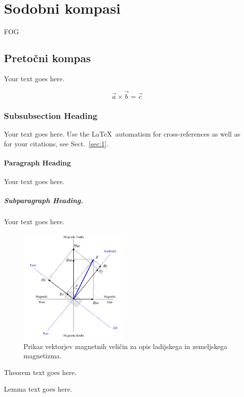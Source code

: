 \section{Sodobni kompasi}
\label{PogKompSod}
FOG

\subsection{Pretočni kompas}
\label{PopdpPretKomp}
Your text goes here.

\begin{equation}
	\vec{a}\times\vec{b}=\vec{c}
\end{equation}

\subsubsection{Subsubsection Heading}
Your text goes here. Use the \LaTeX\ automatism for cross-references as
well as for your citations, see Sect.~\ref{sec:1}.

\paragraph{Paragraph Heading} %
Your text goes here.

\subparagraph{Subparagraph Heading.} Your text goes here.%
%
%
%
%
%
\begin{figure}[!ht]%
	\vspace{0pt}
	\begin{center}
		\includegraphics[width=0.48\textwidth]{Predavanja/02_KompasnoDolocSmeri/figs/2016LadijskiMagnetniVektorji.png}
	\end{center}
	\vspace{0pt}
	\caption{Prikaz vektorjev magnetnih veličin za opis ladijskega in zemeljskega magnetizma. \cite{Basterr}}
	\label{Fig_LadijskiMagnetniVektorji}
	\vspace{0pt}
\end{figure}
%
%
\begin{theorem}
	Theorem text goes here.
\end{theorem}
%
%
\begin{lemma}
	Lemma text goes here.
\end{lemma}
%
%
